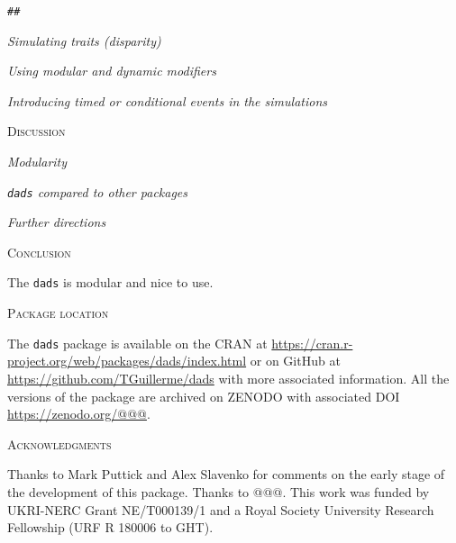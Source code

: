 \documentclass[12pt,letterpaper]{article}
\renewcommand{\section}[1]{%
\bigskip
\begin{center}
\begin{Large}
\normalfont\scshape #1
\medskip
\end{Large}
\end{center}}
\renewcommand{\subsection}[1]{%
\bigskip
\begin{center}
\begin{large}
\normalfont\itshape #1
\end{large}
\end{center}}
\newcommand{\dads}{\texttt{dads} }
\begin{document}
\texttt{## }


\subsection{Simulating traits (disparity)}


\subsection{Using modular and dynamic modifiers}


\subsection{Introducing timed or conditional events in the simulations}


\section{Discussion}

\subsection{Modularity}

\subsection{\dads compared to other packages}

\subsection{Further directions}


\section{Conclusion}
The \dads is modular and nice to use.

\section{Package location}
The \dads package is available on the CRAN at \url{https://cran.r-project.org/web/packages/dads/index.html} or on GitHub at \url{https://github.com/TGuillerme/dads} with more associated information.
All the versions of the package are archived on ZENODO with associated DOI \url{https://zenodo.org/@@@}.

\section{Acknowledgments}
Thanks to Mark Puttick and Alex Slavenko for comments on the early stage of the development of this package. Thanks to @@@. This work was funded by UKRI-NERC Grant NE/T000139/1 and a Royal Society University Research Fellowship (URF R 180006 to GHT).



\end{document}
